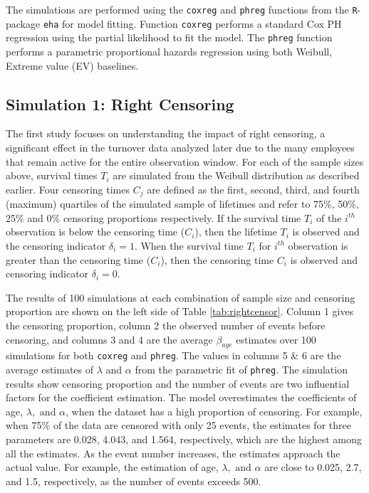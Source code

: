 \documentclass[12pt,letterpaper]{article}
\begin{document}
The simulations are performed using the {\tt coxreg} and {\tt phreg} functions from the {\tt R}-package {\tt eha} \citep{eha} for model fitting.  Function {\tt coxreg} performs a standard Cox PH regression using the partial likelihood to fit the model.  The {\tt phreg} function performs a parametric proportional hazards regression using both Weibull, Extreme value (EV) baselines.



\subsection{Simulation 1: Right Censoring} \label{rightcensor.sim1}

The first study focuses on understanding the impact of right censoring, a significant effect in the turnover data analyzed later due to the many employees that remain active for the entire observation window. For each of the sample sizes above, survival times $T_i$ are simulated from the Weibull distribution as described earlier.  Four censoring times $C_j$ are defined as the first, second, third, and fourth (maximum) quartiles of the simulated sample of lifetimes and refer to 75\%, 50\%, 25\% and 0\% censoring proportions respectively. If the survival time $T_i$ of the $i^{th}$ observation is below the censoring time ($C_i$), then the lifetime $T_i$ is observed and the censoring indicator $\delta_i=1$. When the survival time $T_i$ for $i^{th}$ observation is greater than the censoring time ($C_i$), then the censoring time $C_i$ is observed and censoring indicator $\delta_i = 0$.

The results of 100 simulations at each combination of sample size and censoring proportion are shown on the left side of Table \ref{tab:rightcensor}. Column 1 gives the censoring proportion, column 2 the observed number of events before censoring, and columns 3 and 4 are the average $\beta_{age}$ estimates over 100 simulations for both {\tt coxreg} and {\tt phreg}.  The values in columns 5 \& 6  are the average estimates of $\lambda$ and $\alpha$ from the parametric fit of {\tt phreg}. The simulation results show censoring proportion and the number of events are two influential factors for the coefficient estimation. The model overestimates the coefficients of age, $\lambda, \text{ and } \alpha$, when the dataset has a high proportion of censoring. For example, when 75\% of the data are censored with only 25 events, the estimates for three parameters are 0.028, 4.043, and 1.564, respectively, which are the highest among all the estimates. As the event number increases, the estimates approach the actual value. For example, the estimation of age, $\lambda, \text{ and } \alpha$ are close to 0.025, 2.7, and 1.5, respectively, as the number of events exceeds 500.
\end{document}
